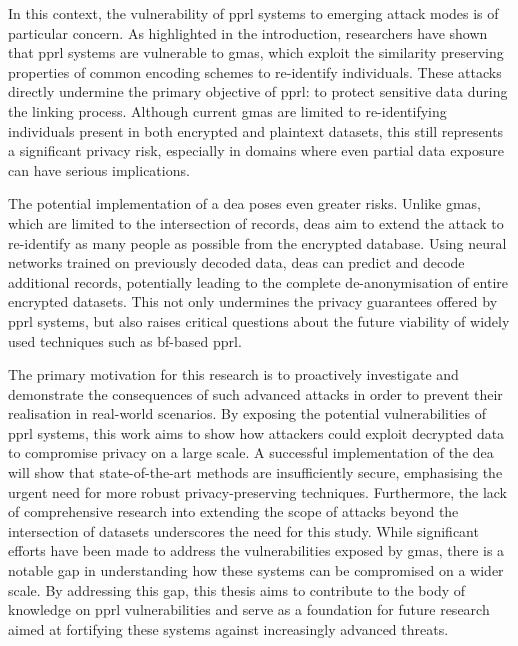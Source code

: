 In this context, the vulnerability of \ac{pprl} systems to emerging attack modes is of particular concern. 
As highlighted in the introduction, researchers have shown that \ac{pprl} systems are vulnerable to \ac{gma}s, which exploit the similarity preserving properties of common encoding schemes to re-identify individuals. 
These attacks directly undermine the primary objective of \ac{pprl}: to protect sensitive data during the linking process. 
Although current \ac{gma}s are limited to re-identifying individuals present in both encrypted and plaintext datasets, this still represents a significant privacy risk, especially in domains where even partial data exposure can have serious implications.

The potential implementation of a \ac{dea} poses even greater risks. 
Unlike \ac{gma}s, which are limited to the intersection of records, \ac{dea}s aim to extend the attack to re-identify as many people as possible from the encrypted database. 
Using neural networks trained on previously decoded data, \ac{dea}s can predict and decode additional records, potentially leading to the complete de-anonymisation of entire encrypted datasets. 
This not only undermines the privacy guarantees offered by \ac{pprl} systems, but also raises critical questions about the future viability of widely used techniques such as \ac{bf}-based \ac{pprl}.

The primary motivation for this research is to proactively investigate and demonstrate the consequences of such advanced attacks in order to prevent their realisation in real-world scenarios.
By exposing the potential vulnerabilities of \ac{pprl} systems, this work aims to show how attackers could exploit decrypted data to compromise privacy on a large scale. 
A successful implementation of the \ac{dea} will show that state-of-the-art methods are insufficiently secure, emphasising the urgent need for more robust privacy-preserving techniques.
Furthermore, the lack of comprehensive research into extending the scope of attacks beyond the intersection of datasets underscores the need for this study. 
While significant efforts have been made to address the vulnerabilities exposed by \ac{gma}s, there is a notable gap in understanding how these systems can be compromised on a wider scale.
By addressing this gap, this thesis aims to contribute to the body of knowledge on \ac{pprl} vulnerabilities and serve as a foundation for future research aimed at fortifying these systems against increasingly advanced threats.



